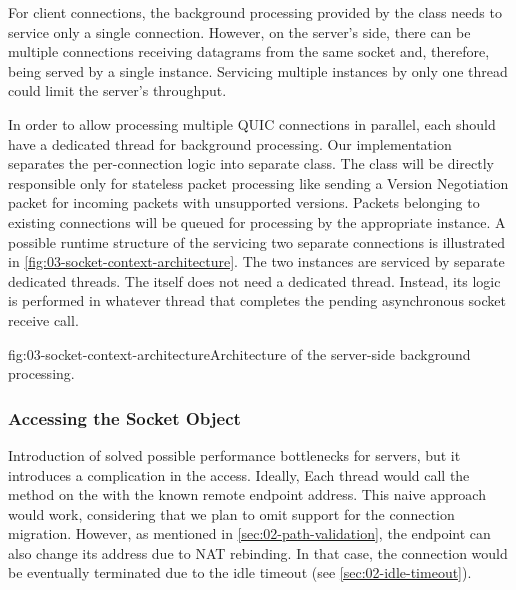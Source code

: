 For client connections, the background processing provided by the \QuicSocketContext{} class needs
to service only a single connection. However, on the server's side, there can be multiple
connections receiving datagrams from the same socket and, therefore, being served by a single
\QuicSocketContext{} instance. Servicing multiple \QuicConnection{} instances by only one thread
could limit the server's throughput.

In order to allow processing multiple QUIC connections in parallel, each \QuicConnection{} should
have a dedicated thread for background processing. Our implementation separates the per-connection
logic into separate \QuicConnectionContext{} class. The \QuicSocketContext{} class will be directly
responsible only for stateless packet processing like sending a Version Negotiation packet for
incoming packets with unsupported versions. Packets belonging to existing connections will be queued
for processing by the appropriate \QuicConnectionContext{} instance. A possible runtime structure of
the \QuicSocketContext{} servicing two separate connections is illustrated in
\autoref{fig:03-socket-context-architecture}. The two \QuicConnectionContext{} instances are
serviced by separate dedicated threads. The \QuicSocketContext{} itself does not need a dedicated
thread. Instead, its logic is performed in whatever thread that completes the pending asynchronous
socket receive call.

\begin{myFigure}{fig:03-socket-context-architecture}{Architecture of the server-side background
processing.}

\resizebox{0.95\linewidth}{!}{}

\end{myFigure}

\subsubsection{Accessing the Socket Object}

Introduction of \QuicConnectionContext{} solved possible performance bottlenecks for servers, but it
introduces a complication in the \Socket{} access. Ideally, Each thread would call the
 method on the \Socket{} with the known remote endpoint address. This naive
approach would work, considering that we plan to omit support for the connection migration. However,
as mentioned in \autoref{sec:02-path-validation}, the endpoint can also change its address due to
NAT rebinding. In that case, the connection would be eventually terminated due to the idle timeout
(see \autoref{sec:02-idle-timeout}).

